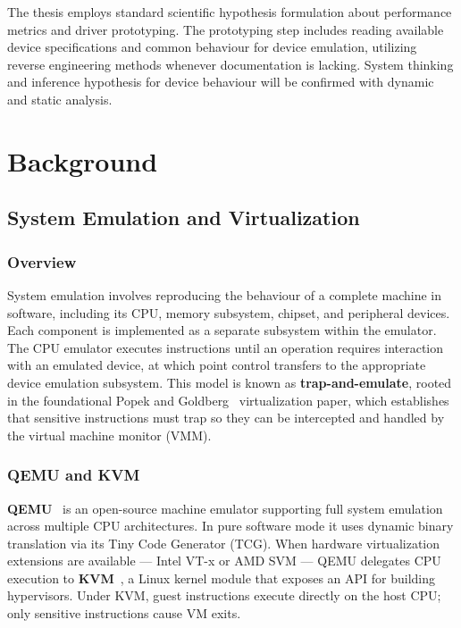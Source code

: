 \documentclass[12pt, a4paper, oneside]{report}
\begin{document}
The thesis employs standard scientific hypothesis formulation about performance
metrics and driver prototyping.  The prototyping step includes reading available
device specifications and common behaviour for device emulation, utilizing reverse
engineering methods whenever documentation is lacking.  System thinking and
inference hypothesis for device behaviour will be confirmed with dynamic and
static analysis.


\chapter{Background}
\label{chap:background}

\section{System Emulation and Virtualization}
\label{sec:virtualization}

\subsection{Overview}

System emulation involves reproducing the behaviour of a complete machine in
software, including its CPU, memory subsystem, chipset, and peripheral devices.
Each component is implemented as a separate subsystem within the emulator.  The
CPU emulator executes instructions until an operation requires interaction with
an emulated device, at which point control transfers to the appropriate device
emulation subsystem.  This model is known as \textbf{trap-and-emulate}, rooted
in the foundational Popek and Goldberg~\cite{popek1974} virtualization paper,
which establishes that sensitive instructions must trap so they can be
intercepted and handled by the virtual machine monitor (VMM).

\subsection{QEMU and KVM}

\textbf{QEMU}~\cite{bellard2005} is an open-source machine emulator supporting
full system emulation across multiple CPU architectures.  In pure software mode
it uses dynamic binary translation via its Tiny Code Generator (TCG).  When
hardware virtualization extensions are available --- Intel VT-x or AMD SVM ---
QEMU delegates CPU execution to \textbf{KVM}~\cite{kivity2007}, a Linux kernel
module that exposes an API for building hypervisors.  Under KVM, guest
instructions execute directly on the host CPU; only sensitive instructions cause
VM exits.
\end{document}
